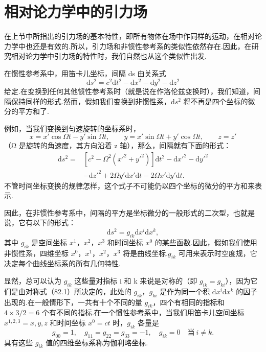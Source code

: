 \section{相对论力学中的引力场}

在上节中所指出的引力场的基本特性，即所有物体在场中作同样的运动，在相对论力学中也还是有效的.所以，引力场和非惯性参考系的类似性依然存在.因此，在研究相对论力学中引力场的特性时，我们自然也从这个类似性出发.

在惯性参考系中，用笛卡儿坐标，间隔 ds 由关系式
\begin{equation*}
  \mathrm{d}s^2=c^2\mathrm{d}t^2-\mathrm{d}x^2-\mathrm{d}y^2-\mathrm{d}z^2
\end{equation*}
给定.在变换到任何其他惯性参考系时（就是说在作洛伦兹变换时），我们知道，间隔保持同样的形式.然而，假如我们变换到非惯性系，$\mathrm{d}s^2$ 将不再是四个坐标的微分的平方和了.

例如，当我们变换到匀速旋转的坐标系时，
\begin{equation*}
  x=x'\cos\varOmega t-y'\sin\varOmega t,\qquad
  y=x'\sin\varOmega t+y'\cos\varOmega t,\qquad
  z=z'
\end{equation*}
（Ω 是旋转的角速度，其方向沿着 z 轴），那么，间隔就有下面的形式：
\begin{equation*}
\begin{aligned}
  \mathrm{d}s^2={}&\left[c^2-\varOmega^2(x'^2+y'^2)\right]\mathrm{d}t^2
  -\mathrm{d}x'^2-\mathrm{d}y'^2\\
  &-\mathrm{d}z'^2+2\varOmega y'\mathrm{d}x'\mathrm{d}t
  -2\varOmega x'\mathrm{d}y'\mathrm{d}t.
\end{aligned}
\end{equation*}
不管时间坐标变换的规律怎样，这个式子不可能仍以四个坐标的微分的平方和来表示.

因此，在非惯性参考系中，间隔的平方是坐标微分的一般形式的二次型，也就是说，它有以下的形式：
\begin{equation}
  \mathrm{d}s^2=g_{ik}\mathrm{d}x^i\mathrm{d}x^k,
\end{equation}
其中 $g_{ik}$ 是空间坐标 $x^1$，$x^2$，$x^3$ 和时间坐标 $x^0$ 的某些函数.因此，假如我们使用非惯性系，四维坐标 $x^0$，$x^1$，$x^2$，$x^3$ 将是曲线坐标.$g_{ik}$ 可用来表示时空度规，它决定每个曲线坐标系的所有几何特性.

显然，总可以认为 $g_{ik}$ 这些量对指标 i 和 k 来说是对称的（即 $g_{ik}=g_{ki}$），因为它们是由对称式（82.1）所决定的，此处的 $g_{ik}$，$g_{ki}$ 是作为同一个积 $\mathrm{d}x^i\mathrm{d}x^k$ 的因子出现的.在一般情形下，一共有十个不同的量 $g_{ik}$，四个有相同的指标和 $4\times3/2=6$ 个有不同的指标.在一个惯性参考系中，当我们用笛卡儿空间坐标 $x^{1,2,3}=x,y,z$ 和时间坐标 $x^0=ct$ 时，$g_{ik}$ 各量是
\begin{equation}
  g_{00}=1,\quad g_{11}=g_{22}=g_{33}=-1,\quad
  g_{ik}=0\quad\text{当}\ i\neq k.
\end{equation}
具有这些 $g_{ik}$ 值的四维坐标系称为伽利略坐标.

